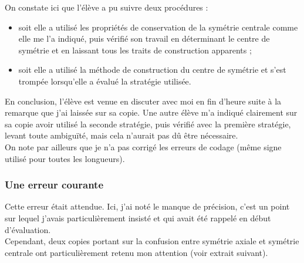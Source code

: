 \clearpage
On constate ici que l'élève a pu suivre deux procédures :
\begin{itemize}
    \item soit elle a utilisé les propriétés de conservation de la symétrie centrale comme elle me l'a indiqué, puis vérifié son travail en déterminant le centre de symétrie et en laissant tous les traits de construction apparents ;
    \item soit elle a utilisé la méthode de construction du centre de symétrie et s'est trompée lorsqu'elle a évalué la stratégie utilisée.
\end{itemize}
En conclusion, l'élève est venue en discuter avec moi en fin d'heure suite à la remarque que j'ai laissée sur sa copie.
Une autre élève m'a indiqué clairement sur sa copie avoir utilisé la seconde stratégie, puis vérifié avec la première stratégie, levant toute ambiguïté, mais cela n'aurait pas dû être nécessaire.\\

On note par ailleurs que je n'a pas corrigé les erreurs de codage (même signe utilisé pour toutes les longueurs).

\subsubsection*{Une erreur courante}\label{confusion}

\begin{figure}[!h]
\end{figure}

Cette erreur était attendue. Ici, j'ai noté le manque de précision, c'est un point sur lequel j'avais particulièrement insisté et qui avait été rappelé en début d'évaluation.\\
Cependant, deux copies portant sur la confusion entre symétrie axiale et symétrie centrale ont particulièrement retenu mon attention (voir extrait suivant).

